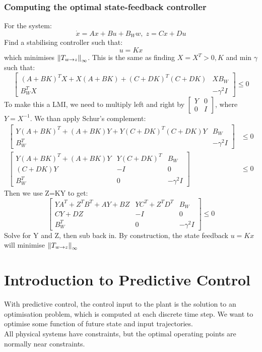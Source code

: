 \documentclass{article}
\begin{document}
\subsubsection*{Computing the optimal state-feedback controller}
For the system:
\[
\dot x = Ax + Bu + B_W w, \; z = Cx + Du
\]
Find a stabilising controller such that:
\[
u = Kx
\]
which minimises $\norm{T_{w \rightarrow z}}_\infty$. This is the same as finding $X = X^T > 0,K$ and min $\gamma$ such that:
\[
\begin{bmatrix}
    (A+BK)^TX + X(A+BK) + (C+DK)^T(C+DK) & XB_W \\
    B_W^TX & -\gamma^2 I
\end{bmatrix} \leq 0
\]
To make this a LMI, we need to multiply left and right by $\begin{bmatrix}
    Y & 0 \\ 0 & I
\end{bmatrix}$, where $Y = X^{-1}$. We than apply Schur's complement:
\[
\begin{aligned}
    \begin{bmatrix}
        Y(A+BK)^T + (A+BK)Y + Y(C+DK)^T(C+DK)Y &B_W \\
        B_W^T & -\gamma^2 I
    \end{bmatrix} &\leq 0 \\
    \begin{bmatrix}
        Y(A+BK)^T + (A+BK)Y & Y(C+DK)^T &B_W \\
        (C+DK)Y & -I & 0 \\
        B_W^T &0 & -\gamma^2 I
    \end{bmatrix} &\leq 0 
\end{aligned}
\]
Then we use Z=KY to get:
\[
\begin{bmatrix}
        YA^T + Z^TB^T + AY +BZ & YC^T + Z^TD^T & B_W \\
        CY+DZ & -I & 0 \\
        B_W^T & 0 & -\gamma^2I
    \end{bmatrix} \leq 0 
\]
Solve for Y and Z, then sub back in. By construction, the state feedback $u=Kx$ will minimise $\norm{T_{w \rightarrow z}}_\infty$
\section{Introduction to Predictive Control}
With predictive control, the control input to the plant is the solution to an optimisation problem, which is computed at each discrete time step. We want to optimise some function of future state and input trajectories. \\
All physical systems have constraints, but the optimal operating points are normally near constraints. \\
\end{document}

